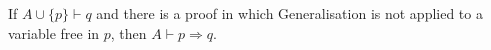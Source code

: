 If $A \cup \{p\} \vdash q$ and there is a proof in which Generalisation is not applied to a variable free in $p$, then $A \vdash p \Rightarrow q$.
